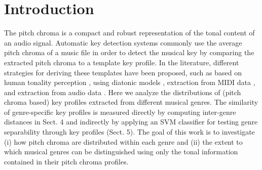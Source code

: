 \documentclass{article}
\title{\papertitle}
\begin{document}
%
\capstartfalse
\maketitle
\capstarttrue
%
\begin{abstract}
The most common approaches to the automatic recognition
of musical key are template-based, i.e., an extracted pitch
chroma vector is compared to a template key profile in order
to identify the most similar key. General as well as domainspecific templates have been used in the past, but to the authors’ best knowledge there has been no study that evaluated
genre-specific key profiles extracted from the audio signal. We
investigate the pitch chroma distributions for 9 different genres, their distances, and the degree to which these genres can
be identified using these distributions when utilizing different
strategies for achieving key-invariance.
\end{abstract}
%

\section{Introduction}\label{sec:introduction}
The pitch chroma is a compact and robust representation of
the tonal content of an audio signal. Automatic key detection
systems commonly use the average pitch chroma of a music
file in order to detect the musical key by comparing the extracted pitch chroma to a template key profile. In the literature,
different strategies for deriving these templates have been proposed, such as based on human tonality perception \cite{krumhansl_cognitive_1990}, using
diatonic models \cite{izmirli_template_2005}, extraction from MIDI data \cite{temperley_pitch-class_2008}, and extraction from audio data \cite{van_de_par_musical_2006}. Here we analyze the distributions
of (pitch chroma based) key profiles extracted from different
musical genres. The similarity of genre-specific key profiles
is measured directly by computing inter-genre distances in
Sect. 4 and indirectly by applying an SVM classifier for testing genre separability through key profiles (Sect. 5). The goal
of this work is to investigate (i) how pitch chroma are distributed within each genre and (ii) the extent to which musical
genres can be distinguished using only the tonal information
contained in their pitch chroma profiles.
\end{document}
